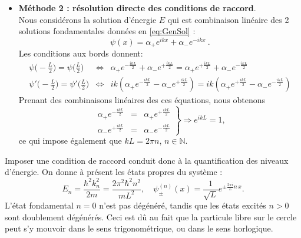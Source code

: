 \begin{enumerate}
{\begin{itemize}[label=$\rhd$]
\item \textbf{Méthode 2 : résolution directe des conditions de raccord}. \\
Nous considérons la solution d'énergie $E$ qui est combinaison linéaire des 2 solutions fondamentales données en \eqref{eq:GenSol} :
\begin{equation}
\psi(x) = \alpha_+ e^{ikx} + \alpha_- e^{-ikx}\ .
\end{equation}
Les conditions aux bords donnent:
\begin{eqnarray}
\psi\Big(-\frac{L}{2}\Big)=\psi\Big(\frac{L}{2}\Big) &\Leftrightarrow & 
 \alpha_+ e^{-\frac{ikL}{2}} + \alpha_- e^{+\frac{ikL}{2}} =  \alpha_+ e^{ +\frac{ikL}{2}} + \alpha_- e^{-\frac{ikL}{2}}\nonumber\\
 \psi'\Big(-\frac{L}{2}\Big)= \psi' \Big(\frac{L}{2}\Big) &\Leftrightarrow & 
 ik\left( \alpha_+ e^{-\frac{ikL}{2}} - \alpha_- e^{+\frac{ikL}{2}} \right)= ik\left(  \alpha_+ e^{+\frac{ikL}{2}} - \alpha_- e^{-\frac{ikL}{2}}\right)\nonumber
\end{eqnarray}
Prenant des combinaisons linéaires des ces équations, nous obtenons
\begin{equation}
\left.
\begin{array}{ccc}
 \alpha_+ e^{-\frac{ikL}{2}}  &=&  \alpha_+ e^{+\frac{ikL}{2}} 
 \\
  \alpha_- e^{+\frac{ikL}{2}} &=&  \alpha_- e^{-\frac{ikL}{2}} 
\end{array}
\right\rbrace \Rightarrow e^{ikL} = 1,
\end{equation}
ce qui impose également que
$ k L = 2\pi n$, $n \in \mathbb{N}$.
\end{itemize}

Imposer une condition de raccord conduit donc à la quantification des niveaux d'énergie. On donne à présent les états propres du système :
\begin{equation}
E_n = \frac{\hbar^2 k_n^2}{2m} = \frac{2\pi^2 \hbar^2 n^2}{m L^2}, \quad \psi_\pm^{(n)} (x) = \frac{1}{\sqrt{L}} e^{\pm \frac{2\pi i}{L}n \, x}.
\end{equation}
L'état fondamental $n=0$ n'est pas dégénéré, tandis que les états excités $n>0$ sont doublement dégénérés. Ceci est dû au fait que la particule libre sur le cercle peut s'y mouvoir dans le sens trigonométrique, ou dans le sens horlogique.
}


\end{enumerate}